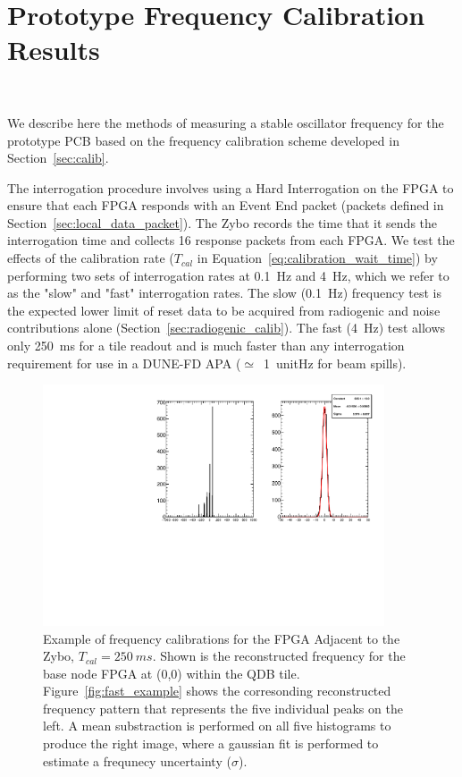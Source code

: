 \section{Prototype Frequency Calibration Results}~\label{sec:freq_calib_results}

We describe here the methods of measuring a stable oscillator frequency for the prototype PCB based on the frequency calibration scheme developed in Section~\ref{sec:calib}.

The interrogation procedure involves using a Hard Interrogation on the FPGA to ensure that each FPGA responds with an Event End packet (packets defined in Section~\ref{sec:local_data_packet}).
The Zybo records the time that it sends the interrogation time and collects 16 response packets from each FPGA.
We test the effects of the calibration rate ($T_{cal}$ in Equation~\ref{eq:calibration_wait_time}) by performing two sets of interrogation rates at 0.1~\unit{Hz} and 4~\unit{Hz}, which we refer to as the "slow" and "fast" interrogation rates.
The slow (0.1~\unit{Hz}) frequency test is the expected lower limit of reset data to be acquired from radiogenic and noise contributions alone (Section~\ref{sec:radiogenic_calib}).
The fast (4~\unit{Hz}) test allows only 250~\unit{ms} for a tile readout and is much faster than any interrogation requirement for use in a DUNE-FD APA ($\simeq$~1~unit{Hz} for beam spills). 

\begin{figure}[]
\centering
\includegraphics[width=0.9\textwidth]{images/(0,0).pdf}
\caption{Example of frequency calibrations for the FPGA Adjacent to the Zybo, $T_{cal} = 250~\unit{ms}$.
Shown is the reconstructed frequency for the base node FPGA at (0,0) within the QDB tile.
Figure~\ref{fig:fast_example} shows the corresonding reconstructed frequency pattern that represents the five individual peaks on the left.
A mean substraction is performed on all five histograms to produce the right image, where a gaussian fit is performed to estimate a frequnecy uncertainty ($\sigma$).
}
\label{fig:frq_recon_node00}
\end{figure}

